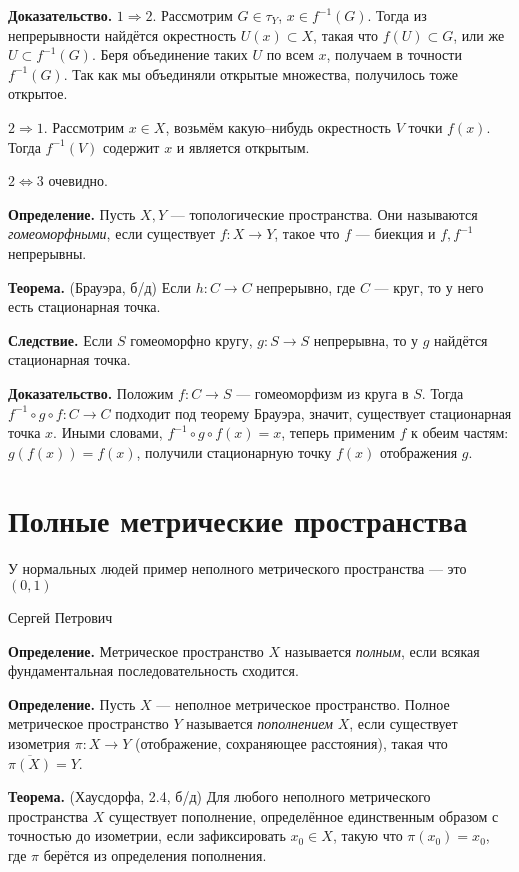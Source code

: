 \textbf{Доказательство.} $1 \Rightarrow 2$. 
Рассмотрим $G \in \tau_Y$, $x \in f^{-1}(G)$.
Тогда из непрерывности найдётся окрестность $U(x) \subset X$, такая что $f(U) \subset G$, или же $U \subset f^{-1}(G)$.
Беря объединение таких $U$ по всем $x$, получаем в точности $f^{-1}(G)$.
Так как мы объединяли открытые множества, получилось тоже открытое.

$2 \Rightarrow 1$. Рассмотрим $x \in X$, возьмём какую--нибудь окрестность $V$ точки $f(x)$.
Тогда $f^{-1}(V)$ содержит $x$ и является открытым.

$2 \iff 3$ очевидно.

\QED

\textbf{Определение.} Пусть $X, Y$ --- топологические пространства.
Они называются \textit{гомеоморфными}, если существует $f: X \to Y$, такое что $f$ --- биекция и $f, f^{-1}$ непрерывны.

\textbf{Теорема.} (Брауэра, б/д) Если $h: C \to C$ непрерывно, где $C$ --- круг, то у него есть стационарная точка.

\textbf{Следствие.} Если $S$ гомеоморфно кругу, $g: S \to S$ непрерывна, то у $g$ найдётся стационарная точка.

\textbf{Доказательство.} Положим $f: C \to S$ --- гомеоморфизм из круга в $S$.
Тогда $f^{-1} \circ g \circ f: C \to C$ подходит под теорему Брауэра, значит, существует стационарная точка $x$.
Иными словами, $f^{-1} \circ g \circ f(x) = x$, теперь применим $f$ к обеим частям: $g(f(x)) = f(x)$, получили стационарную точку $f(x)$ отображения $g$.

\QED

\section{Полные метрические пространства}
\epigraph{У нормальных людей пример неполного метрического пространства --- это $(0, 1)$}{Сергей Петрович}

\textbf{Определение.} Метрическое пространство $X$ называется \textit{полным}, если всякая фундаментальная последовательность сходится.

\textbf{Определение.} Пусть $X$ --- неполное метрическое пространство. 
Полное метрическое пространство $Y$ называется \textit{пополнением} $X$, если существует изометрия $\pi: X \to Y$ (отображение, сохраняющее расстояния), такая что $\overline{\pi(X)} = Y$.

\textbf{Теорема.} (Хаусдорфа, 2.4, б/д) Для любого неполного метрического пространства $X$ существует пополнение, определённое единственным образом с точностью до изометрии, если зафиксировать $x_0 \in X$, такую что $\pi(x_0) = x_0$, где $\pi$ берётся из определения пополнения.

